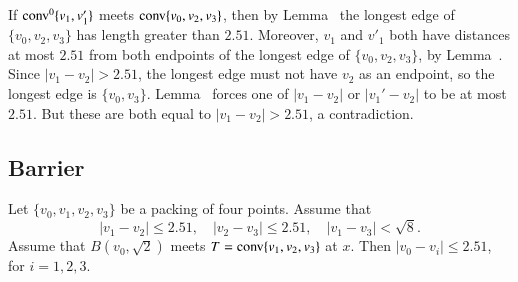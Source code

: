 \begin{tarskidata}
\begin{tarski}
\begin{proved}
If ${\operatorname{conv}}^0\{v_1,v'_1\}$ meets ${\operatorname{conv}}\{v_0,v_2,v_3\}$, then by
Lemma~ the longest edge of $\{v_0,v_2,v_3\}$
has length greater than $2.51$. 
Moreover, $v_1$ and $v'_1$ both have distances at most $2.51$
from both endpoints of the longest edge of $\{v_0,v_2,v_3\}$, 
by Lemma~.  Since
$|v_1-v_2|>2.51$, the longest edge must not have $v_2$ as an endpoint,
so the longest edge is $\{v_0,v_3\}$.
Lemma~ forces one of $|v_1-v_2|$ or
$|v_1'-v_2|$ to be at most $2.51$. But these are both equal to
$|v_1-v_2|>2.51$, a contradiction.
\swallowed\end{proved}
\end{tarski}













\begin{tarski}
\section{Barrier}

\begin{lemma}
Let $\{v_0,v_1,v_2,v_3\}$ be a packing of four points.
Assume that 
$$
   |v_1-v_2|\le 2.51,\quad |v_2-v_3|\le 2.51,\quad |v_1-v_3|<\sqrt8.
$$
Assume that $B(v_0,\sqrt2)$ meets $T={\operatorname{conv}}\{v_1,v_2,v_3\}$ at $x$.
Then $|v_0-v_i|\le 2.51$, for $i=1,2,3$.
\end{lemma}



\end{tarski}
\end{tarskidata}
